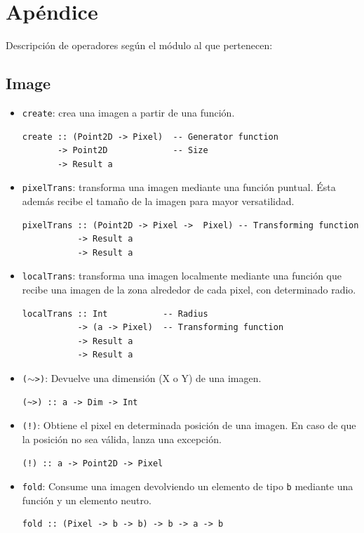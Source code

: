 \documentclass[a4paper, 11pt]{article} %
\begin{document}

\section*{Apéndice}
Descripción de operadores según el módulo al que pertenecen:

\subsection*{Image}
	\begin{itemize} 
		\item \texttt{create}: crea una imagen a partir de una función.
\begin{lstlisting}
create :: (Point2D -> Pixel)  -- Generator function
       -> Point2D             -- Size
       -> Result a
\end{lstlisting}
		\item \texttt{pixelTrans}: transforma una imagen mediante una función puntual. Ésta además recibe el tamaño de la imagen para mayor versatilidad.
\begin{lstlisting}
pixelTrans :: (Point2D -> Pixel ->  Pixel) -- Transforming function
           -> Result a
           -> Result a
\end{lstlisting}
		\item \texttt{localTrans}: transforma una imagen localmente mediante una función que recibe una imagen de la zona alrededor de cada pixel, con determinado radio.
\begin{lstlisting}
localTrans :: Int           -- Radius
           -> (a -> Pixel)  -- Transforming function
           -> Result a
           -> Result a
\end{lstlisting}
		\item \texttt{($\sim$>)}: Devuelve una dimensión (X o Y) de una imagen.
\begin{lstlisting}
(~>) :: a -> Dim -> Int
\end{lstlisting}
		\item \texttt{(!)}: Obtiene el pixel en determinada posición de una imagen. En caso de que la posición no sea válida, lanza una excepción.
\begin{lstlisting}
(!) :: a -> Point2D -> Pixel
\end{lstlisting}
		\item \texttt{fold}: Consume una imagen devolviendo un elemento de tipo \texttt{b} mediante una función y un elemento neutro.
\begin{lstlisting}
fold :: (Pixel -> b -> b) -> b -> a -> b
\end{lstlisting}

	\end{itemize}
\end{document}
